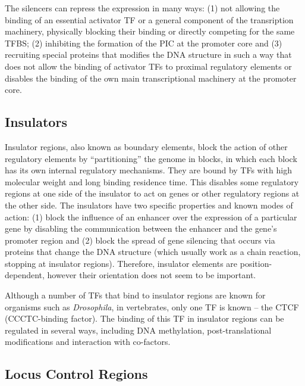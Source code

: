 The silencers can repress the expression in many ways: (1) not allowing the binding of an essential activator TF or a general component of the transription machinery, physically blocking their binding or directly competing for the same TFBS; (2) inhibiting the formation of the PIC at the promoter core and (3) recruiting special proteins that modifies the DNA structure in such a way that does not allow the binding of activator TFs to proximal regulatory elements or disables the binding of the own main transcriptional machinery at the promoter core.

\subsection{Insulators}
\label{sec:insulators}

Insulator regions, also known as boundary elements, block the action of other regulatory elements by ``partitioning'' the genome in blocks, in which each block has its own internal regulatory mechanisms. They are bound by TFs with high molecular weight and long binding residence time. This disables some regulatory regions at one side of the insulator to act on genes or other regulatory regions at the other side. The insulators have two specific properties and known modes of action: (1) block the influence of an enhancer over the expression of a particular gene by disabling the communication between the enhancer and the gene's promoter region and (2) block the spread of gene silencing that occurs via proteins that change the DNA structure (which usually work as a chain reaction, stopping at insulator regions). Therefore, insulator elements are position-dependent, however their orientation does not seem to be important.

Although a number of TFs that bind to insulator regions are known for organisms such as \emph{Drosophila}, in vertebrates, only one TF is known -- the CTCF (CCCTC-binding factor). The binding of this TF in insulator regions can be regulated in several ways, including DNA methylation, post-translational modifications and interaction with co-factors.

\subsection{Locus Control Regions}
\label{sec:locus.control.regions}

